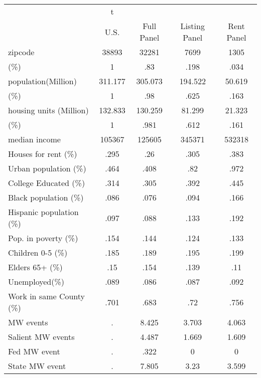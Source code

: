 \begin{tabular}{l*{4}{c}}
\hline\hline
            &           t&            &            &            \\
            &        U.S.&  Full Panel&Listing Panel&  Rent Panel\\
\hline
zipcode     &       38893&       32281&        7699&        1305\\
(\%)        &           1&         .83&        .198&        .034\\
population(Million)&     311.177&     305.073&     194.522&      50.619\\
(\%)        &           1&         .98&        .625&        .163\\
housing units (Million)&     132.833&     130.259&      81.299&      21.323\\
(\%)        &           1&        .981&        .612&        .161\\
median income&      105367&      125605&      345371&      532318\\
Houses for rent (\%)&        .295&         .26&        .305&        .383\\
Urban population (\%)&        .464&        .408&         .82&        .972\\
College Educated (\%)&        .314&        .305&        .392&        .445\\
Black population (\%)&        .086&        .076&        .094&        .166\\
Hispanic population (\%)&        .097&        .088&        .133&        .192\\
Pop. in poverty (\%)&        .154&        .144&        .124&        .133\\
Children 0-5 (\%)&        .185&        .189&        .195&        .199\\
Elders 65+ (\%)&         .15&        .154&        .139&         .11\\
Unemployed(\%)&        .089&        .086&        .087&        .092\\
Work in same County (\%)&        .701&        .683&         .72&        .756\\
MW events   &           .&       8.425&       3.703&       4.063\\
Salient MW events&           .&       4.487&       1.669&       1.609\\
Fed MW event&           .&        .322&           0&           0\\
State MW event&           .&       7.805&        3.23&       3.599\\

\end{tabular}
